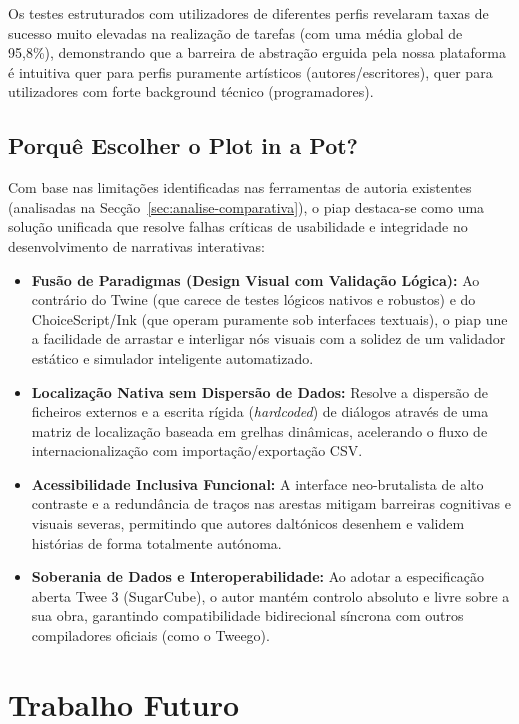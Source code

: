 Os testes estruturados com utilizadores de diferentes perfis revelaram taxas de sucesso muito elevadas na realização de tarefas (com uma média global de 95,8\%), demonstrando que a barreira de abstração erguida pela nossa plataforma é intuitiva quer para perfis puramente artísticos (autores/escritores), quer para utilizadores com forte background técnico (programadores).

\subsection{Porquê Escolher o Plot in a Pot?}
\label{subsec:porque-escolher-piap}
Com base nas limitações identificadas nas ferramentas de autoria existentes (analisadas na Secção~\ref{sec:analise-comparativa}), o \gls{piap} destaca-se como uma solução unificada que resolve falhas críticas de usabilidade e integridade no desenvolvimento de narrativas interativas:
\begin{itemize}
    \item \textbf{Fusão de Paradigmas (Design Visual com Validação Lógica):} Ao contrário do Twine (que carece de testes lógicos nativos e robustos) e do ChoiceScript/Ink (que operam puramente sob interfaces textuais), o \gls{piap} une a facilidade de arrastar e interligar nós visuais com a solidez de um validador estático e simulador inteligente automatizado.
    \item \textbf{Localização Nativa sem Dispersão de Dados:} Resolve a dispersão de ficheiros externos e a escrita rígida (\textit{hardcoded}) de diálogos através de uma matriz de localização baseada em grelhas dinâmicas, acelerando o fluxo de internacionalização com importação/exportação CSV.
    \item \textbf{Acessibilidade Inclusiva Funcional:} A interface neo-brutalista de alto contraste e a redundância de traços nas arestas mitigam barreiras cognitivas e visuais severas, permitindo que autores daltónicos desenhem e validem histórias de forma totalmente autónoma.
    \item \textbf{Soberania de Dados e Interoperabilidade:} Ao adotar a especificação aberta Twee 3 (SugarCube), o autor mantém controlo absoluto e livre sobre a sua obra, garantindo compatibilidade bidirecional síncrona com outros compiladores oficiais (como o Tweego).
\end{itemize}

\section{Trabalho Futuro}
\label{sec:trabalho-futuro}

